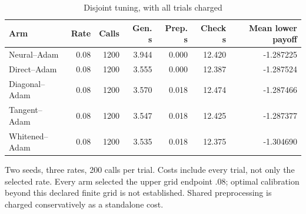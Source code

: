 \begin{table}[htbp]\centering\small
\caption{Disjoint tuning, with all trials charged}\label{tab:r24tuning}
\begin{tabular}{lrrrrrr}\toprule
Arm & Rate & Calls & Gen. s & Prep. s & Check s & Mean lower payoff\\\midrule
Neural--Adam & 0.08 & 1200 & 3.944 & 0.000 & 12.420 & -1.287225\\
Direct--Adam & 0.08 & 1200 & 3.555 & 0.000 & 12.387 & -1.287524\\
Diagonal--Adam & 0.08 & 1200 & 3.570 & 0.018 & 12.474 & -1.287466\\
Tangent--Adam & 0.08 & 1200 & 3.547 & 0.018 & 12.425 & -1.287377\\
Whitened--Adam & 0.08 & 1200 & 3.535 & 0.018 & 12.375 & -1.304690\\
\bottomrule\end{tabular}
\par\smallskip\begin{minipage}{.97\textwidth}\footnotesize Two seeds, three rates, 200 calls per trial. Costs include every trial, not only the selected rate. Every arm selected the upper grid endpoint .08; optimal calibration beyond this declared finite grid is not established. Shared preprocessing is charged conservatively as a standalone cost.\end{minipage}
\end{table}
